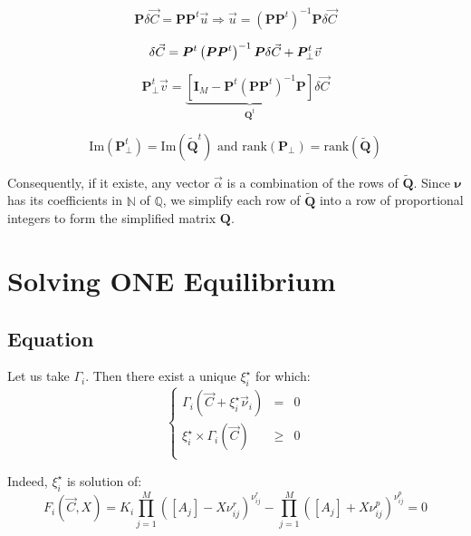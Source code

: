 \documentclass[aps,12pt]{revtex4}
\begin{document}
\begin{equation}
	\bm{P} \delta \vec{C} = \bm{P}\bm{P}^t\vec{u}
	 \Rightarrow \vec{u} = \left(\bm{P}\bm{P}^t\right)^{-1} \bm{P} \delta \vec{C}
\end{equation}

\begin{equation}
	\delta\vec{C} =  \bm{P}^t\left(\bm{P}\bm{P}^t\right)^{-1} \bm{P} \delta \vec{C} + \bm{P}_\perp^t \vec{v}\\
\end{equation}
	
\begin{equation}
	\bm{P}_\perp^t \vec{v} = 
	\underbrace{\left\lbrack \bm{I}_M - \bm{P}^t\left(\bm{P}\bm{P}^t\right)^{-1} \bm{P} \right\rbrack}_{\bm{Q}^t} \delta\vec{C}
\end{equation}

\begin{equation}
	\mathrm{Im}\left(\bm{P}_\perp^t\right) = \mathrm{Im}\left(\bm{\tilde Q}^t\right) \text{ and }
	\mathrm{rank}(\bm{P}_\perp) = \mathrm{rank}(\bm{\tilde Q})
\end{equation}

Consequently, if it existe, any vector $\vec{\alpha}$ is a combination of the rows of $\bm{\tilde Q}$.
Since $\bm{\nu}$ has its coefficients in $\mathbb{N}$ of $\mathbb{Q}$, we simplify each row of 
$\bm{\tilde Q}$ into a row of proportional integers to form the simplified matrix $\bm{Q}$.


\section{Solving ONE Equilibrium}

\subsection{Equation}
Let us take $\Gamma_i$.
Then there exist a unique $\xi_i^\star$ for which:
\begin{equation}
\left\lbrace
\begin{array}{rcl}
	\Gamma_i(\vec{C} + \xi_i^\star \vec{\nu}_i ) & = & 0\\
	 \xi_i^\star \times \Gamma_i(\vec{C}) &\geq  &0\\
\end{array}
\right.
\end{equation}
 
Indeed, $\xi_i^\star$ is solution of:
\begin{equation}
	 F_i(\vec{C},X) =  K_i \prod_{j=1}^{M} \left([A_j] - X \nu^r_{ij}\right)^{\nu^r_{ij}} 
	- \prod_{j=1}^{M} \left([A_j] + X \nu^p_{ij} \right)^{\nu^p_{ij}} = 0
\end{equation} 
\end{document}
